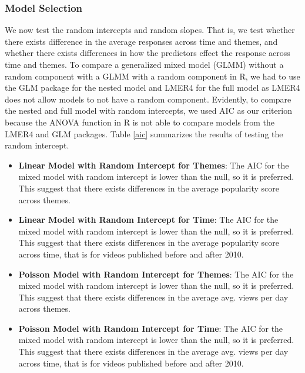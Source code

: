 \subsubsection{Model Selection}
We now test the random intercepts and random slopes. That is, we test whether there exists difference in the average responses across time and themes, and whether there exists differences in how the predictors effect the response across time and themes.
To compare a generalized mixed model (GLMM) without a random component with a GLMM with a random component in R, we had to use the GLM package for the nested model and LMER4 for the full model as LMER4 does not allow models to not have a random component. Evidently, to compare the nested and full model with random intercepts, we used AIC as our criterion because the ANOVA function in R is not able to compare models from the LMER4 and GLM packages. Table \ref{aic} summarizes the results of testing the random intercept.

\begin{itemize}
	\item \textbf{Linear Model with Random Intercept for Themes}: The AIC for the mixed model with random intercept is lower than the null, so it is preferred. This suggest that there exists differences in the average popularity score across themes.
	\item \textbf{Linear Model with Random Intercept for Time}: The AIC for the mixed model with random intercept is lower than the null, so it is preferred. This suggest that there exists differences in the average popularity score across time, that is for videos published before and after 2010.
	\item \textbf{Poisson Model with Random Intercept for Themes}: The AIC for the mixed model with random intercept is lower than the null, so it is preferred. This suggest that there exists differences in the average avg. views per day across themes.
	\item \textbf{Poisson Model with Random Intercept for Time}: The AIC for the mixed model with random intercept is lower than the null, so it is preferred. This suggest that there exists differences in the average avg. views per day across time, that is for videos published before and after 2010.
\end{itemize}

